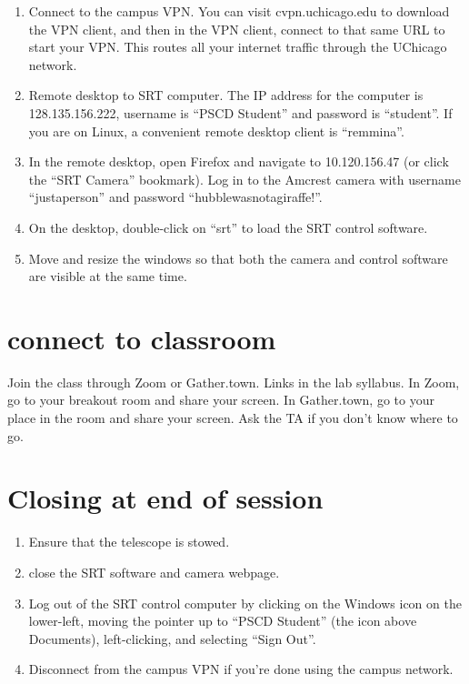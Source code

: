 \documentclass{article}
\begin{document}
\begin{enumerate}
	\item Connect to the campus VPN. You can visit cvpn.uchicago.edu to download the VPN client, and then in the VPN client, connect to that same URL to start your VPN. This routes all your internet traffic through the UChicago network.

	\item Remote desktop to SRT computer. The IP address for the computer is 128.135.156.222, username is ``PSCD Student'' and password is ``student''. If you are on Linux, a convenient remote desktop client is ``remmina''.
	
	\item In the remote desktop, open Firefox and navigate to 10.120.156.47 (or click the ``SRT Camera'' bookmark). Log in to the Amcrest camera with username ``justaperson'' and password ``hubblewasnotagiraffe!''.
	
	\item On the desktop, double-click on ``srt'' to load the SRT control software.
	
	\item Move and resize the windows so that both the camera and control software are visible at the same time.
\end{enumerate}
	
\section{connect to classroom}

Join the class through Zoom or Gather.town. Links in the lab syllabus. In Zoom, go to your breakout room and share your screen. In Gather.town, go to your place in the room and share your screen. Ask the TA if you don't know where to go.

\section{Closing at end of session}

\begin{enumerate}
	\item Ensure that the telescope is stowed.
	
	\item close the SRT software and camera webpage.
	
	\item Log out of the SRT control computer by clicking on the Windows icon on the lower-left, moving the pointer up to ``PSCD Student'' (the icon above Documents), left-clicking, and selecting ``Sign Out''.
	
	\item Disconnect from the campus VPN if you're done using the campus network.
\end{enumerate}
	
\end{document}
